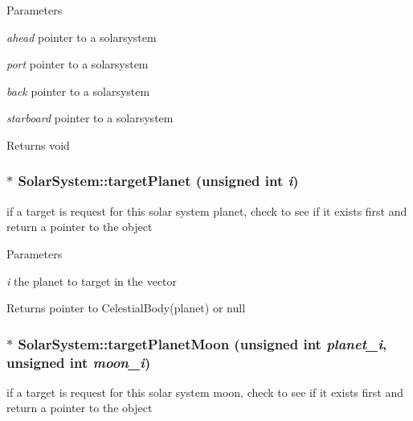\begin{DoxyParams}{Parameters}
\item[{\em ahead}]pointer to a solarsystem \item[{\em port}]pointer to a solarsystem \item[{\em back}]pointer to a solarsystem \item[{\em starboard}]pointer to a solarsystem\end{DoxyParams}
\begin{DoxyReturn}{Returns}
void 
\end{DoxyReturn}
\hypertarget{classSolarSystem_a149b4356b3dd7da090b33dc699cc9b7c}{
\subsubsection[{targetPlanet}]{ $\ast$ SolarSystem::targetPlanet (unsigned int {\em i})}}
\label{df/d5e/classSolarSystem_a149b4356b3dd7da090b33dc699cc9b7c}
if a target is request for this solar system planet, check to see if it exists first and return a pointer to the object


\begin{DoxyParams}{Parameters}
\item[{\em i}]the planet to target in the vector\end{DoxyParams}
\begin{DoxyReturn}{Returns}
pointer to CelestialBody(planet) or null 
\end{DoxyReturn}
\hypertarget{classSolarSystem_af1511d3f14b0be819941f585fef039a0}{
\subsubsection[{targetPlanetMoon}]{ $\ast$ SolarSystem::targetPlanetMoon (unsigned int {\em planet\_\-i}, \/  unsigned int {\em moon\_\-i})}}
\label{df/d5e/classSolarSystem_af1511d3f14b0be819941f585fef039a0}
if a target is request for this solar system moon, check to see if it exists first and return a pointer to the object


